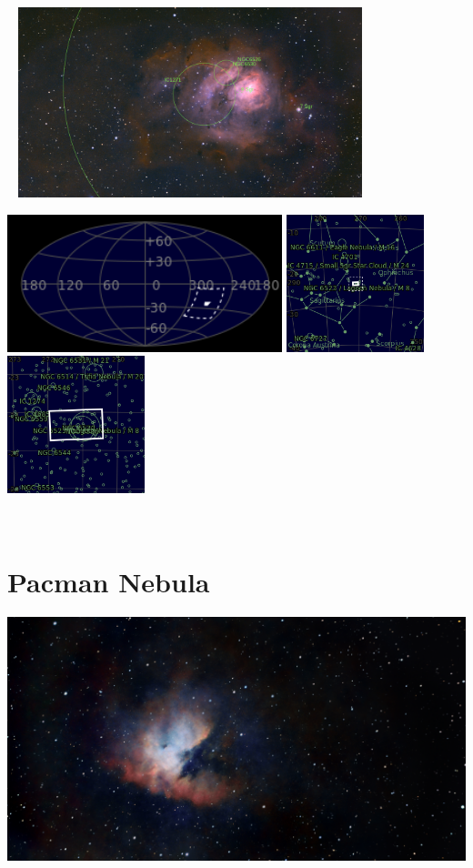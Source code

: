 \begin{center}
 \ \newpage
\includegraphics[width=0.75\textwidth]{../Imaging//Annotated/Lagoon_Nebula_Annotated.jpg}

\includegraphics[height=4cm]{../Imaging//Annotated/Lagoon_Nebula_Globe.jpg}
\includegraphics[height=4cm]{../Imaging//Annotated/Lagoon_Nebula_Close.jpg}
\includegraphics[height=4cm]{../Imaging//Annotated/Lagoon_Nebula_Closer.jpg}
\end{center}
\ \\\section{Pacman Nebula}
\includegraphics[width=\textwidth]{../Imaging//Original/Pacman_Nebula.jpg}
